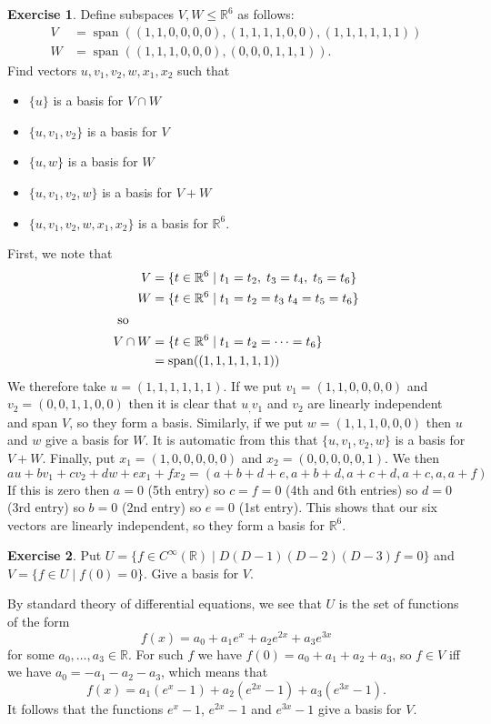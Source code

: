 \documentclass[a4paper]{amsart}
\newcommand{\R}         {{\mathbb{R}}}
\newcommand{\st}        {\;|\;}
\newcommand{\spn}       {\operatorname{span}}
\renewcommand{\:}{\colon}
\theoremstyle{definition}
\newtheorem{exercise}{Exercise}
\newenvironment{solution}{{\noindent \bf Solution:}}{}
\begin{document}
\begin{exercise}
 Define subspaces $V,W\leq\R^6$ as follows:
 \begin{align*}
  V &= \spn((1,1,0,0,0,0),(1,1,1,1,0,0),(1,1,1,1,1,1)) \\
  W &= \spn((1,1,1,0,0,0),(0,0,0,1,1,1)).
 \end{align*}
 Find vectors $u,v_1,v_2,w,x_1,x_2$ such that 
 \begin{itemize}
  \item $\{u\}$ is a basis for $V\cap W$
  \item $\{u,v_1,v_2\}$ is a basis for $V$
  \item $\{u,w\}$ is a basis for $W$
  \item $\{u,v_1,v_2,w\}$ is a basis for $V+W$
  \item $\{u,v_1,v_2,w,x_1,x_2\}$ is a basis for $\R^6$.
 \end{itemize}
\end{exercise}
\begin{solution}
 First, we note that
 \begin{align*}
  V &= \{t\in\R^6\st t_1=t_2,\; t_3=t_4,\; t_5=t_6\} \\
  W &= \{t\in\R^6\st t_1=t_2=t_3\; t_4=t_5=t_6\} \\
 \intertext{ so } 
  V\cap W &= \{t\in\R^6\st t_1=t_2=\dotsb=t_6\} \\
   &= \spn((1,1,1,1,1,1))
 \end{align*}
 We therefore take $u=(1,1,1,1,1,1)$.  If we put
 $v_1=(1,1,0,0,0,0)$ and $v_2=(0,0,1,1,0,0)$ then it is
 clear that $u_,v_1$ and $v_2$ are linearly independent and
 span $V$, so they form a basis.  Similarly, if we put
 $w=(1,1,1,0,0,0)$ then $u$ and $w$ give a basis for $W$.
 It is automatic from this that $\{u,v_1,v_2,w\}$ is a basis
 for $V+W$.  Finally, put $x_1=(1,0,0,0,0,0)$ and
 $x_2=(0,0,0,0,0,1)$.  We then 
 \[ au+bv_1+cv_2+dw+ex_1+fx_2 = 
    (a+b+d+e,a+b+d,a+c+d,a+c,a,a+f)
 \]
 If this is zero then $a=0$ (5th entry) so $c=f=0$ (4th and
 6th entries) so $d=0$ (3rd entry) so $b=0$ (2nd entry) so
 $e=0$ (1st entry).  This shows that our six vectors are
 linearly independent, so they form a basis for $\R^6$.
\end{solution}


\begin{exercise}
 Put $U=\{f\in C^\infty(\R)\st D(D-1)(D-2)(D-3)f=0\}$ and
 $V=\{f\in U\st f(0)=0\}$.  Give a basis for $V$. 
\end{exercise}
\begin{solution}
 By standard theory of differential equations, we see that
 $U$ is the set of functions of the form 
 \[ f(x) = a_0 + a_1e^x + a_2e^{2x} + a_3e^{3x} \]
 for some $a_0,\dotsc,a_3\in\R$.  For such $f$ we have
 $f(0)=a_0+a_1+a_2+a_3$, so $f\in V$ iff we have
 $a_0=-a_1-a_2-a_3$, which means that 
 \[ f(x) = a_1(e^x-1) + a_2(e^{2x}-1) + a_3(e^{3x}-1). \]
 It follows that the functions $e^x-1$, $e^{2x}-1$ and
 $e^{3x}-1$ give a basis for $V$.
\end{solution}
\end{document}
